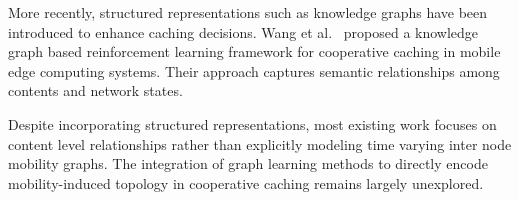 More recently, structured representations such as knowledge graphs have been introduced to enhance caching decisions. Wang et al.~\cite{wang2024knowledge} proposed a knowledge graph based reinforcement learning framework for cooperative caching in mobile edge computing systems. Their approach captures semantic relationships among contents and network states. 

Despite incorporating structured representations, most existing work focuses on content level relationships rather than explicitly modeling time varying inter node mobility graphs. The integration of graph learning methods to directly encode mobility-induced topology in cooperative caching remains largely unexplored.
